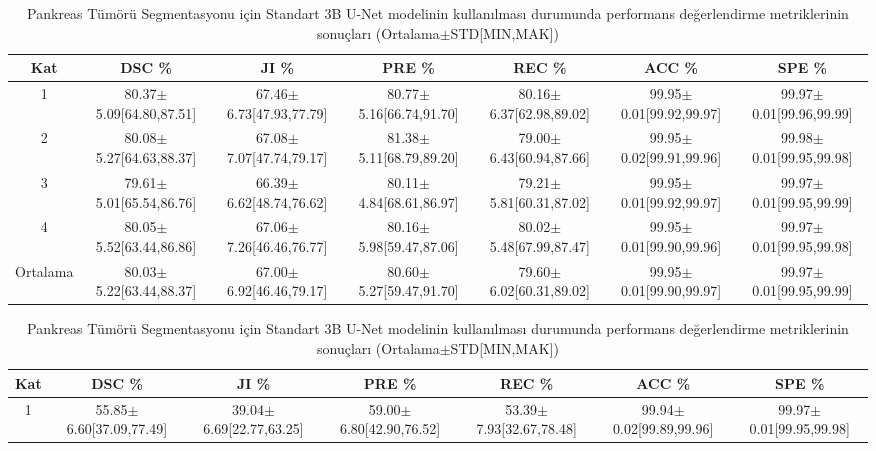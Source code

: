 \begin{table}
	\centering
	\caption{Pankreas Segmentasyonu için Standart 3B U-Net modelinin kullanılması durumunda performans değerlendirme metriklerinin sonuçları (Ortalama$\pm$STD[MIN,MAK])}
	\label{tab:p2unetp}
	\begin{adjustbox}{width=\textwidth}		
		\begin{tabular}{ccccccc}
			\toprule
			Kat   &  DSC \%       &  JI  \%   &  PRE  \%   &  REC  \%  & ACC  \%  &  SPE  \% \\ 
			\midrule 
			1 & 80.37$\pm$5.09[64.80,87.51] & 67.46$\pm$6.73[47.93,77.79] & 80.77$\pm$5.16[66.74,91.70] & 80.16$\pm$6.37[62.98,89.02] & 99.95$\pm$0.01[99.92,99.97] & 99.97$\pm$0.01[99.96,99.99] \\
            2 & 80.08$\pm$5.27[64.63,88.37] & 67.08$\pm$7.07[47.74,79.17] & 81.38$\pm$5.11[68.79,89.20] & 79.00$\pm$6.43[60.94,87.66] & 99.95$\pm$0.02[99.91,99.96] & 99.98$\pm$0.01[99.95,99.98] \\
            3 & 79.61$\pm$5.01[65.54,86.76] & 66.39$\pm$6.62[48.74,76.62] & 80.11$\pm$4.84[68.61,86.97] & 79.21$\pm$5.81[60.31,87.02] & 99.95$\pm$0.01[99.92,99.97] & 99.97$\pm$0.01[99.95,99.99] \\
            4 & 80.05$\pm$5.52[63.44,86.86] & 67.06$\pm$7.26[46.46,76.77] & 80.16$\pm$5.98[59.47,87.06] & 80.02$\pm$5.48[67.99,87.47] & 99.95$\pm$0.01[99.90,99.96] & 99.97$\pm$0.01[99.95,99.98] \\
			\toprule
			Ortalama &	80.03$\pm$5.22[63.44,88.37] & 67.00$\pm$6.92[46.46,79.17] & 80.60$\pm$5.27[59.47,91.70] & 79.60$\pm$6.02[60.31,89.02] & 99.95$\pm$0.01[99.90,99.97] & 99.97$\pm$0.01[99.95,99.99] \\	
			\bottomrule			
		\end{tabular}
	\end{adjustbox}
	\vspace{2\baselineskip}
	\caption{Pankreas Tümörü Segmentasyonu için Standart 3B U-Net modelinin kullanılması durumunda performans değerlendirme metriklerinin sonuçları (Ortalama$\pm$STD[MIN,MAK])}
	\label{tab:p2unett}
	\begin{adjustbox}{width=\textwidth}		
		\begin{tabular}{ccccccc}
			\toprule
			Kat   &  DSC \%       &  JI  \%   &  PRE  \%   &  REC  \%  & ACC  \%  &  SPE  \% \\ 
			\midrule 
			1 & 55.85$\pm$6.60[37.09,77.49] & 39.04$\pm$6.69[22.77,63.25] & 59.00$\pm$6.80[42.90,76.52] & 53.39$\pm$7.93[32.67,78.48] & 99.94$\pm$0.02[99.89,99.96] & 99.97$\pm$0.01[99.95,99.98] \\

\end{tabular}
\end{adjustbox}
\end{table}

